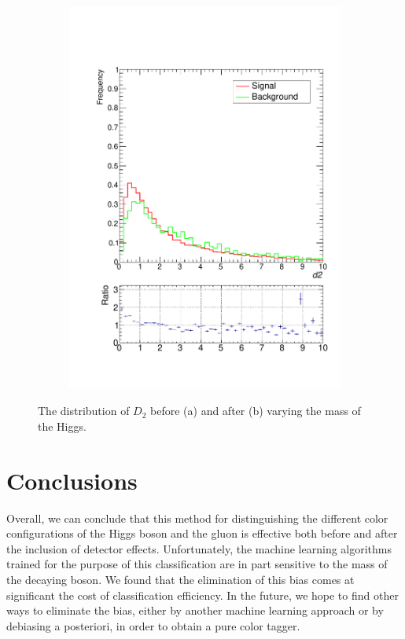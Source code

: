 \documentclass[10pt,a4paper]{book}
\begin{document}
\begin{figure}[h]
\begin{subfigure}{0.5\textwidth}
\includegraphics[scale=0.35]{ch4_images/d2_distribution_massbias}
\caption{}
\end{subfigure}
\caption{The distribution of $D_2$ before (a) and after (b) varying the mass of the Higgs.}
\label{d2 mass bias}
\end{figure}


\section{Conclusions}

Overall, we can conclude that this method for distinguishing the different color configurations of the Higgs boson and the gluon is effective both before and after the inclusion of detector effects. Unfortunately, the machine learning algorithms trained for the purpose of this classification are in part sensitive to the mass of the decaying boson. We found that the elimination of this bias comes at significant the cost of classification efficiency. In the future, we hope to find other ways to eliminate the bias, either by another machine learning approach or by debiasing a posteriori, in order to obtain a pure color tagger.
\end{document}
